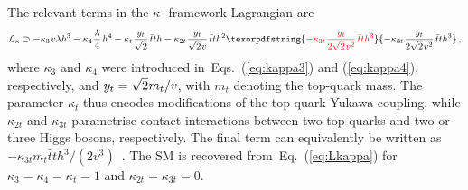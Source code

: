 \documentclass{SciPost}
\def\beq{\begin{equation}}
\def\eeq{\end{equation}}
\providecommand{\DIFaddtex}[1]{{\protect\color{red} #1}} %
\providecommand{\DIFdeltex}[1]{} %
\providecommand{\DIFaddbegin}{} %
\providecommand{\DIFaddend}{} %
\providecommand{\DIFdelbegin}{} %
\providecommand{\DIFdelend}{} %
\providecommand{\DIFadd}[1]{\texorpdfstring{\DIFaddtex{#1}}{#1}} %
\providecommand{\DIFdel}[1]{\texorpdfstring{\DIFdeltex{#1}}{}} %
\begin{document}
The \DIFaddbegin \DIFadd{relevant terms in the }\DIFaddend $\kappa$\DIFdelbegin \DIFdel{-formalism Lagrangian, which parametrises the interaction vertices highlighted in ~Figure~\ref{fig:diagrams}, takes the form
}\DIFdelend \DIFaddbegin \DIFadd{-framework Lagrangian are
}\DIFaddend \beq \label{eq:Lkappa}
{\cal L}_{\kappa} \supset -\kappa_3 \hspace{0.25mm} v \lambda h^3 -\kappa_4 \hspace{0.25mm} \frac{\lambda}{4} \hspace{0.5mm} h^4 -\kappa_t \hspace{0.25mm} \frac{y_t}{\sqrt{2}} \hspace{0.5mm} \bar t t h  -\kappa_{2t} \hspace{0.25mm} \frac{y_t}{\sqrt{2} \hspace{0.25mm} v} \hspace{0.5mm} \bar t t h^2 \DIFaddbegin \DIFadd{-\kappa_{3t} \hspace{0.25mm} \frac{y_t}{2\sqrt{2} \hspace{0.25mm} v^2} \hspace{0.5mm} \bar t t h^3 }\DIFaddend \,,
\eeq
where $\kappa_3$ and $\kappa_4$ were introduced in~Eqs.~(\ref{eq:kappa3}) and (\ref{eq:kappa4}), respectively, and $y_t = \sqrt{2} \hspace{0.125mm} m_t/v$, with $m_t$ denoting the top-quark mass. The parameter $\kappa_t$ thus encodes modifications of the top-quark Yukawa coupling, while \DIFdelbegin \DIFdel{the parameter }\DIFdelend $\kappa_{2t}$ \DIFdelbegin \DIFdel{parametrises the coupling }\DIFdelend \DIFaddbegin \DIFadd{and $\kappa_{3t}$ parametrise contact interactions }\DIFaddend between two top quarks and two \DIFdelbegin \DIFdel{Higgs bosons}\DIFdelend \DIFaddbegin \DIFadd{or three Higgs bosons, respectively. The final term can equivalently be written as $-\kappa_{3t}m_t\bar t t h^3/(2v^3)$~\cite{Papaefstathiou:2023uum}}\DIFaddend . The SM is recovered from~Eq.~(\ref{eq:Lkappa}) for $\kappa_3 = \kappa_4 = \kappa_t = 1$ and \DIFdelbegin \DIFdel{$\kappa_{2t} = 0$}\DIFdelend \DIFaddbegin \DIFadd{$\kappa_{2t} = \kappa_{3t} = 0$}\DIFaddend .
\end{document}
